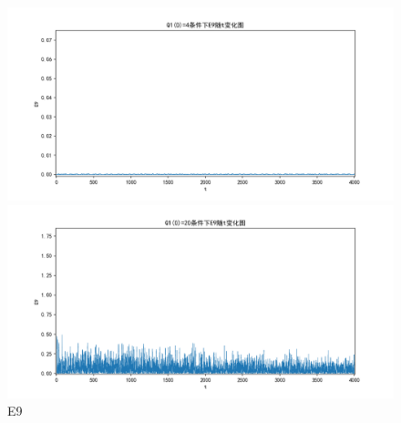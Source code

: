 \documentclass[10pt, a4paper]{article}
\begin{document}
    \begin{figure}[H]
        \begin{minipage}[t]{0.49\textwidth}
            \centering
            \includegraphics[width=\textwidth]{./q5_pics/cmp/E9.png}
        \end{minipage}
        \begin{minipage}[t]{0.49\textwidth}
            \centering
            \includegraphics[width=\textwidth]{./q5_pics/exp/E9.png}
        \end{minipage}
        \caption{E9}\label{fig:E9 in q5}
    \end{figure}
\end{document}
